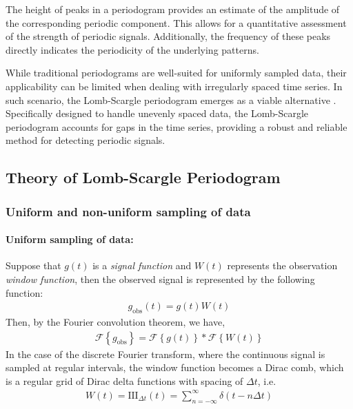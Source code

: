     		The height of peaks in a periodogram provides an estimate of the amplitude of the corresponding periodic component. This allows for a quantitative assessment of the strength of periodic signals. Additionally, the frequency of these peaks directly indicates the periodicity of the underlying patterns.
    		
    		While traditional periodograms are well-suited for uniformly sampled data, their applicability can be limited when dealing with irregularly spaced time series. In such scenario, the Lomb-Scargle periodogram emerges as a viable alternative \cite{lomb1976least,scargle1982studies}. Specifically designed to handle unevenly spaced data, the Lomb-Scargle periodogram accounts for gaps in the time series, providing a robust and reliable method for detecting periodic signals.
    		
    	\subsection{Theory of Lomb-Scargle Periodogram}
    	
    		\subsubsection{Uniform and non-uniform sampling of data}
    			\paragraph{Uniform sampling of data:}
    			Suppose that $g(t)$ is a \textit{signal function} and $W(t)$ represents the observation \textit{window function}, then the observed signal is represented by the following function:
    			\begin{align}
    				g_\text{obs}(t)=g(t)W(t) \label{eqn:obs-func}
    			\end{align}
    			Then, by the Fourier convolution theorem, we have,
    			\begin{align}
    				\mathscr{F}\left\lbrace g_\text{obs} \right\rbrace = \mathscr{F}\left\lbrace g(t) \right\rbrace * \mathscr{F}\left\lbrace W(t) \right\rbrace \label{eqn:FT-obs-func}
    			\end{align}
    			In the case of the discrete Fourier transform, where the continuous signal is sampled at regular intervals, the window function becomes a Dirac comb, which is a regular grid of Dirac delta functions with spacing of $\Delta t$, i.e.
    			\begin{align}
    				W(t)=\text{III}_{\Delta t}(t)=\sum_{n=-\infty}^{\infty}{\delta(t-n\Delta t)} \label{eqn:dirac-comb}
    			\end{align}
    			
